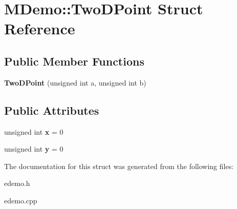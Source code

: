 \hypertarget{struct_m_demo_1_1_two_d_point}{\section{M\-Demo\-:\-:Two\-D\-Point Struct Reference}
\label{struct_m_demo_1_1_two_d_point}
}
\subsection*{Public Member Functions}
\begin{DoxyCompactItemize}
\item 
\hypertarget{struct_m_demo_1_1_two_d_point_a78a2a50aa595b6dcf1a6fc2cb09dab4e}{{\bfseries Two\-D\-Point} (unsigned int a, unsigned int b)}\label{struct_m_demo_1_1_two_d_point_a78a2a50aa595b6dcf1a6fc2cb09dab4e}

\end{DoxyCompactItemize}
\subsection*{Public Attributes}
\begin{DoxyCompactItemize}
\item 
\hypertarget{struct_m_demo_1_1_two_d_point_ad505f0b8648c126247913282ab507bb5}{unsigned int {\bfseries x} = 0}\label{struct_m_demo_1_1_two_d_point_ad505f0b8648c126247913282ab507bb5}

\item 
\hypertarget{struct_m_demo_1_1_two_d_point_a19e975e710dad5dcd2f9a31be0c97322}{unsigned int {\bfseries y} = 0}\label{struct_m_demo_1_1_two_d_point_a19e975e710dad5dcd2f9a31be0c97322}

\end{DoxyCompactItemize}


The documentation for this struct was generated from the following files\-:\begin{DoxyCompactItemize}
\item 
edemo.\-h\item 
edemo.\-cpp\end{DoxyCompactItemize}
